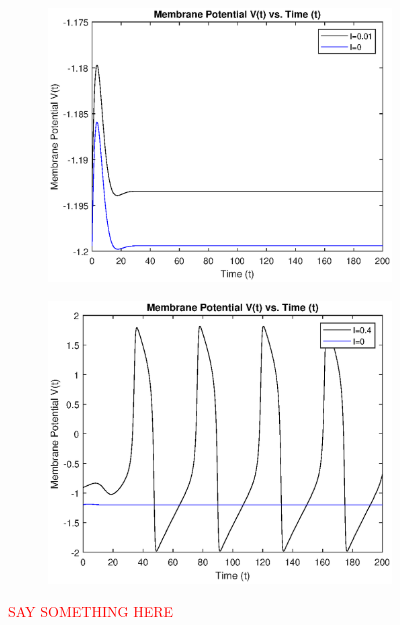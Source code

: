 \documentclass{book}
\theoremstyle{definition}
\begin{document}
\begin{figure}[!htb]
	\centering
	\begin{subfigure}{0.5\textwidth}
		\centering
		\includegraphics[scale=0.6]{FHN_lab/V_t_2.eps}
	\end{subfigure}%
	\begin{subfigure}{0.5\textwidth}
		\centering
		\includegraphics[scale=0.6]{FHN_lab/V_t_3.eps}

	\end{subfigure}%
	\caption{\textcolor{red}{SAY SOMETHING HERE}}
	\label{Fig:3}
\end{figure}
\end{document}
